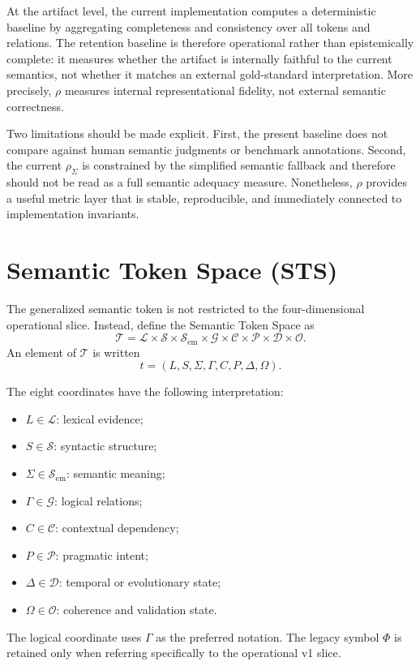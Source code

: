 \documentclass{article}
\newcommand{\STS}{{\normalfont\textsc{STS}}}
\newcommand{\Lex}{\mathcal{L}}
\newcommand{\Syn}{\mathcal{S}}
\newcommand{\Sem}{\mathcal{S}_{\mathrm{em}}}
\newcommand{\Rel}{\mathcal{G}}
\newcommand{\Ctx}{\mathcal{C}}
\newcommand{\Prag}{\mathcal{P}}
\newcommand{\Temp}{\mathcal{D}}
\newcommand{\Coh}{\mathcal{O}}
\newcommand{\TokSpace}{\mathcal{T}}
\begin{document}
At the artifact level, the current implementation computes a deterministic baseline by aggregating completeness and consistency over all tokens and relations. The retention baseline is therefore operational rather than epistemically complete: it measures whether the artifact is internally faithful to the current semantics, not whether it matches an external gold-standard interpretation. More precisely, \(\rho\) measures internal representational fidelity, not external semantic correctness.

Two limitations should be made explicit. First, the present baseline does not compare against human semantic judgments or benchmark annotations. Second, the current \(\rho_\Sigma\) is constrained by the simplified semantic fallback and therefore should not be read as a full semantic adequacy measure. Nonetheless, \(\rho\) provides a useful metric layer that is stable, reproducible, and immediately connected to implementation invariants.

\section{Semantic Token Space (\STS{})}

The generalized semantic token is not restricted to the four-dimensional operational slice. Instead, define the Semantic Token Space as
\[
\TokSpace = \Lex \times \Syn \times \Sem \times \Rel \times \Ctx \times \Prag \times \Temp \times \Coh.
\]
An element of \(\TokSpace\) is written
\[
t = (L, S, \Sigma, \Gamma, C, P, \Delta, \Omega).
\]

The eight coordinates have the following interpretation:
\begin{itemize}
\item \(L \in \Lex\): lexical evidence;
\item \(S \in \Syn\): syntactic structure;
\item \(\Sigma \in \Sem\): semantic meaning;
\item \(\Gamma \in \Rel\): logical relations;
\item \(C \in \Ctx\): contextual dependency;
\item \(P \in \Prag\): pragmatic intent;
\item \(\Delta \in \Temp\): temporal or evolutionary state;
\item \(\Omega \in \Coh\): coherence and validation state.
\end{itemize}

The logical coordinate uses \(\Gamma\) as the preferred notation. The legacy symbol \(\Phi\) is retained only when referring specifically to the operational v1 slice.
\end{document}
